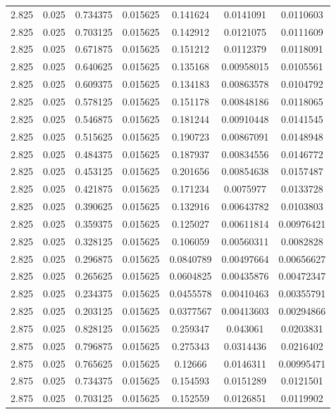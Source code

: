 \begin{flushleft}
\begin{longtable}{ccccccc}
2.825 & 0.025 & 0.734375 & 0.015625 & 0.141624 & 0.0141091 & 0.0110603  \\ 
2.825 & 0.025 & 0.703125 & 0.015625 & 0.142912 & 0.0121075 & 0.0111609  \\ 
2.825 & 0.025 & 0.671875 & 0.015625 & 0.151212 & 0.0112379 & 0.0118091  \\ 
2.825 & 0.025 & 0.640625 & 0.015625 & 0.135168 & 0.00958015 & 0.0105561  \\ 
2.825 & 0.025 & 0.609375 & 0.015625 & 0.134183 & 0.00863578 & 0.0104792  \\ 
2.825 & 0.025 & 0.578125 & 0.015625 & 0.151178 & 0.00848186 & 0.0118065  \\ 
2.825 & 0.025 & 0.546875 & 0.015625 & 0.181244 & 0.00910448 & 0.0141545  \\ 
2.825 & 0.025 & 0.515625 & 0.015625 & 0.190723 & 0.00867091 & 0.0148948  \\ 
2.825 & 0.025 & 0.484375 & 0.015625 & 0.187937 & 0.00834556 & 0.0146772  \\ 
2.825 & 0.025 & 0.453125 & 0.015625 & 0.201656 & 0.00854638 & 0.0157487  \\ 
2.825 & 0.025 & 0.421875 & 0.015625 & 0.171234 & 0.0075977 & 0.0133728  \\ 
2.825 & 0.025 & 0.390625 & 0.015625 & 0.132916 & 0.00643782 & 0.0103803  \\ 
2.825 & 0.025 & 0.359375 & 0.015625 & 0.125027 & 0.00611814 & 0.00976421  \\ 
2.825 & 0.025 & 0.328125 & 0.015625 & 0.106059 & 0.00560311 & 0.0082828  \\ 
2.825 & 0.025 & 0.296875 & 0.015625 & 0.0840789 & 0.00497664 & 0.00656627  \\ 
2.825 & 0.025 & 0.265625 & 0.015625 & 0.0604825 & 0.00435876 & 0.00472347  \\ 
2.825 & 0.025 & 0.234375 & 0.015625 & 0.0455578 & 0.00410463 & 0.00355791  \\ 
2.825 & 0.025 & 0.203125 & 0.015625 & 0.0377567 & 0.00413603 & 0.00294866  \\ 
2.875 & 0.025 & 0.828125 & 0.015625 & 0.259347 & 0.043061 & 0.0203831  \\ 
2.875 & 0.025 & 0.796875 & 0.015625 & 0.275343 & 0.0314436 & 0.0216402  \\ 
2.875 & 0.025 & 0.765625 & 0.015625 & 0.12666 & 0.0146311 & 0.00995471  \\ 
2.875 & 0.025 & 0.734375 & 0.015625 & 0.154593 & 0.0151289 & 0.0121501  \\ 
2.875 & 0.025 & 0.703125 & 0.015625 & 0.152559 & 0.0126851 & 0.0119902  \\ 

\end{longtable}
\end{flushleft}
